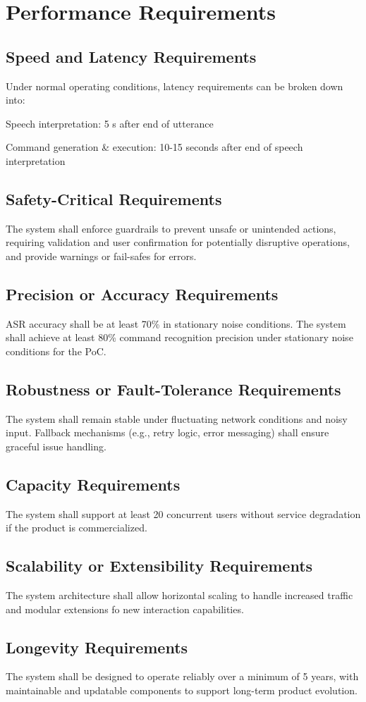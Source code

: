 \documentclass[11pt]{article}
\begin{document}
\section{Performance Requirements}
\subsection{Speed and Latency Requirements}
Under normal operating conditions, latency requirements can be broken down into:

Speech interpretation: 5 s after end of utterance

Command generation \& execution: 10-15 seconds after end of speech interpretation
\subsection{Safety-Critical Requirements}
The system shall enforce guardrails to prevent unsafe or unintended actions, requiring validation and user confirmation for potentially disruptive operations, and provide warnings or fail-safes for errors.
\subsection{Precision or Accuracy Requirements}
ASR accuracy shall be at least 70\% in stationary noise conditions. The system shall achieve at least 80\% command recognition precision under stationary noise conditions for the PoC.
\subsection{Robustness or Fault-Tolerance Requirements}
The system shall remain stable under fluctuating network conditions and noisy input. Fallback mechanisms (e.g., retry logic, error messaging) shall ensure graceful issue handling.
\subsection{Capacity Requirements}
The system shall support at least 20 concurrent users without service degradation if the product is commercialized.
\subsection{Scalability or Extensibility Requirements}
The system architecture shall allow horizontal scaling to handle increased traffic and modular extensions fo new interaction capabilities. 
\subsection{Longevity Requirements}
The system shall be designed to operate reliably over a minimum of 5 years, with maintainable and updatable components to support long-term product evolution.
\end{document}
